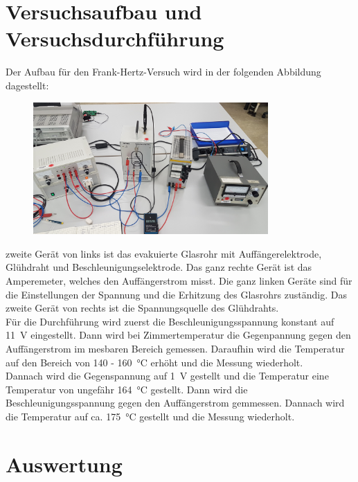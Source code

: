 \section{Versuchsaufbau und Versuchsdurchführung}\justifying
Der Aufbau für den Frank-Hertz-Versuch wird in der folgenden Abbildung dagestellt:
\begin{figure}[H]
    \centering
    \includegraphics[width=0.8\textwidth]{images/Aufbau.jpg}
    \caption{} %
    \label{fig:4}
\end{figure}
 zweite Gerät von links ist das evakuierte Glasrohr mit Auffängerelektrode, Glühdraht und
Beschleunigungselektrode. Das ganz rechte Gerät ist das Amperemeter, welches den
Auffängerstrom misst. Die ganz linken Geräte sind für die Einstellungen der Spannung und 
die Erhitzung des Glasrohrs zuständig. Das zweite Gerät von rechts ist die Spannungsquelle
des Glühdrahts.\\
Für die Durchführung wird zuerst die Beschleunigungsspannung konstant auf \SI{11}{\volt} eingestellt.
Dann wird bei Zimmertemperatur die Gegenpannung gegen den Auffängerstrom im mesbaren Bereich gemessen.
Daraufhin wird die Temperatur auf den Bereich von 140 - \SI{160}{\celsius} erhöht und die Messung wiederholt.\\
Dannach wird die Gegenspannung auf \SI{1}{\volt} gestellt und die Temperatur eine Temperatur von
ungefähr \SI{164}{\celsius} gestellt. Dann wird die Beschleunigungsspannung gegen
den Auffängerstrom gemmessen. Dannach wird die Temperatur auf ca. \SI{175}{\celsius} gestellt 
und die Messung wiederholt.



\section{Auswertung}

